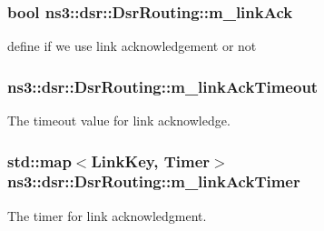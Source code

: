 \subsubsection[{\texorpdfstring{m\+\_\+link\+Ack}{m_linkAck}}]{\setlength{\rightskip}{0pt plus 5cm}bool ns3\+::dsr\+::\+Dsr\+Routing\+::m\+\_\+link\+Ack\hspace{0.3cm}{\ttfamily [private]}}\hypertarget{classns3_1_1dsr_1_1DsrRouting_a216a52d8b579a034df948765d941d3a4}{}\label{classns3_1_1dsr_1_1DsrRouting_a216a52d8b579a034df948765d941d3a4}


define if we use link acknowledgement or not 

\subsubsection[{\texorpdfstring{m\+\_\+link\+Ack\+Timeout}{m_linkAckTimeout}}]{ ns3\+::dsr\+::\+Dsr\+Routing\+::m\+\_\+link\+Ack\+Timeout\hspace{0.3cm}{\ttfamily [private]}}\hypertarget{classns3_1_1dsr_1_1DsrRouting_ace1671263c7f09cd2523f1c81dc41631}{}\label{classns3_1_1dsr_1_1DsrRouting_ace1671263c7f09cd2523f1c81dc41631}


The timeout value for link acknowledge. 

\subsubsection[{\texorpdfstring{m\+\_\+link\+Ack\+Timer}{m_linkAckTimer}}]{\setlength{\rightskip}{0pt plus 5cm}std\+::map$<${\bf Link\+Key}, {\bf Timer}$>$ ns3\+::dsr\+::\+Dsr\+Routing\+::m\+\_\+link\+Ack\+Timer\hspace{0.3cm}{\ttfamily [private]}}\hypertarget{classns3_1_1dsr_1_1DsrRouting_ad532172035dbd4b038de0e94f4ce5ff6}{}\label{classns3_1_1dsr_1_1DsrRouting_ad532172035dbd4b038de0e94f4ce5ff6}


The timer for link acknowledgment. 

